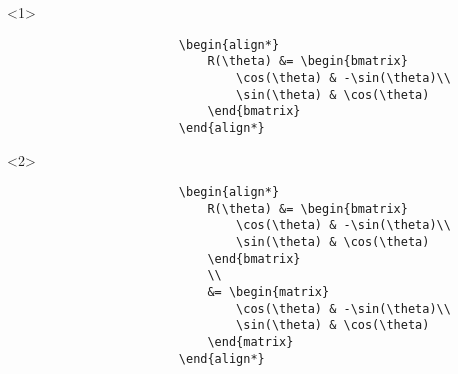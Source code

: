 \begin{frame}[fragile]
\begin{columns}
\begin{column}{0.5\textwidth}
            \begin{adjustbox}{valign=T,set height=0pt,set depth=0.8\textheight,valign=B}%
                \begin{minipage}{0.9\textwidth}%
                    \leavevmode
                \begin{onlyenv}<1>
                    \begin{verbatim}
                        \begin{align*}
                            R(\theta) &= \begin{bmatrix}
                                \cos(\theta) & -\sin(\theta)\\
                                \sin(\theta) & \cos(\theta)
                            \end{bmatrix}
                        \end{align*}
                    \end{verbatim}
                \end{onlyenv}%
                \begin{onlyenv}<2>
                    \begin{verbatim}
                        \begin{align*}
                            R(\theta) &= \begin{bmatrix}
                                \cos(\theta) & -\sin(\theta)\\
                                \sin(\theta) & \cos(\theta)
                            \end{bmatrix}
                            \\
                            &= \begin{matrix}
                                \cos(\theta) & -\sin(\theta)\\
                                \sin(\theta) & \cos(\theta)
                            \end{matrix}
                        \end{align*}

\end{verbatim}
\end{onlyenv}
\end{minipage}
\end{adjustbox}
\end{column}
\end{columns}
\end{frame}
